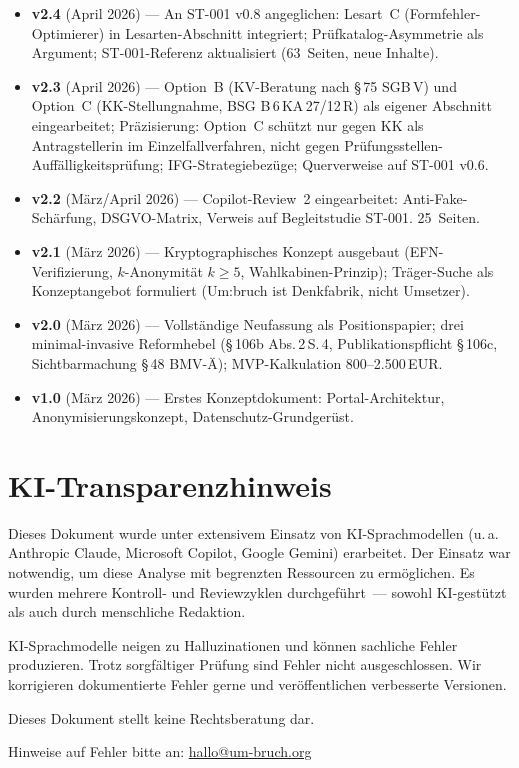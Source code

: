 \documentclass{umbruch-position}
\begin{document}
{\begin{itemize}[leftmargin=3em, itemsep=0.5em]
  \item \textbf{v2.4} (April 2026) --- An ST-001 v0.8 angeglichen: Lesart~C (Formfehler-Optimierer) in Lesarten-Abschnitt integriert; Prüfkatalog-Asymmetrie als Argument; ST-001-Referenz aktualisiert (63~Seiten, neue Inhalte).

  \item \textbf{v2.3} (April 2026) --- Option~B (KV-Beratung nach \S\,75 SGB\,V) und Option~C (KK-Stell\-ungnahme, BSG B\,6\,KA\,27/12\,R) als eigener Abschnitt eingearbeitet; Präzisierung: Option~C schützt nur gegen KK als Antragstellerin im Einzelfallverfahren, nicht gegen Prüfungs\-stellen-Auffälligkeitsprüfung; IFG-Strate\-giebezüge; Quer\-verweise auf ST-001 v0.6.

  \item \textbf{v2.2} (März/April 2026) --- Copilot-Review~2 eingearbeitet: Anti-Fake-Schärfung, DSGVO-Matrix, Verweis auf Begleit\-studie ST-001. 25~Seiten.

  \item \textbf{v2.1} (März 2026) --- Krypto\-graphisches Konzept ausgebaut (EFN-Verifizierung, $k$-Anonymität $k\geq5$, Wahlkabinen-Prinzip); Träger-Suche als Konzeptangebot formuliert (Um:bruch ist Denkfabrik, nicht Umsetzer).

  \item \textbf{v2.0} (März 2026) --- Vollständige Neufassung als Positionspapier; drei minimal-invasive Reformhebel (\S\,106b Abs.\,2\,S.\,4, Publikations\-pflicht \S\,106c, Sichtbar\-machung \S\,48 BMV-Ä); MVP-Kalkulation 800--2.500\,EUR.

  \item \textbf{v1.0} (März 2026) --- Erstes Konzeptdokument: Portal-Architektur, Anonymisierungs\-konzept, Datenschutz-Grundgerüst.
\end{itemize}
}

\newpage
\section*{KI-Transparenzhinweis}

\noindent Dieses Dokument wurde unter extensivem Einsatz von KI-Sprachmodellen (u.\,a. Anthropic Claude, Microsoft Copilot, Google Gemini) erarbeitet. Der Einsatz war notwendig, um diese Analyse mit begrenzten Ressourcen zu ermöglichen. Es wurden mehrere Kontroll- und Reviewzyklen durchgeführt~--- sowohl KI-gestützt als auch durch menschliche Redaktion.

\medskip\noindent KI-Sprachmodelle neigen zu Halluzinationen und können sachliche Fehler produzieren. Trotz sorgfältiger Prüfung sind Fehler nicht ausgeschlossen. Wir korrigieren dokumentierte Fehler gerne und veröffentlichen verbesserte Versionen.

\medskip\noindent Dieses Dokument stellt keine Rechtsberatung dar.

\medskip\noindent Hinweise auf Fehler bitte an: \href{mailto:hallo@um-bruch.org}{hallo@um-bruch.org}
\end{document}
